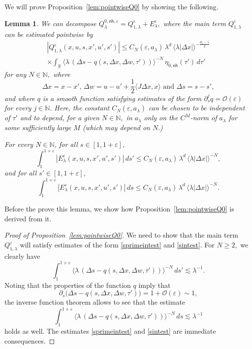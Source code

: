 \documentclass[leqno]{amsart}
\newtheorem{lemma}[theorem]{Lemma}
\theoremstyle{definition}
\theoremstyle{remark}
\numberwithin{equation}{section}
\newcommand{\R}{\mathbb{R}}
\newcommand{\N}{\mathbb{N}}
\newcommand\la{{\lambda}}
\newcommand\ve{{\varepsilon}}
\begin{document}
We will prove Proposition~\ref{lem:pointwiseQ0} by showing the following.

\begin{lemma}\label{lem:pointwiseQ0-precise} 
We can decompose $Q^{0,\mathsf{nh},\varepsilon}_\lambda=Q^{\varepsilon}_{1,\lambda}+E^\ve_\la,$ where the main term 
$Q^{\varepsilon}_{1,\lambda}$ can be estimated pointwise by 
\begin{multline}\label{eq:pointwiseQ0}
|Q^{\varepsilon}_{1,\lambda}(x,u,s,x',u',s')| \le C_N(\ve,a_\la)\, \lambda^d
\, \langle\lambda\left|\Delta x\right|\rangle^{-\frac{d_1-1}2} \\
\times \int_\R \big\langle \lambda\, (\Delta s - q(s,\Delta x,\Delta w,\tau') ) \big\rangle^{-N} \, \eta_{0,\mathsf{nh}}(\tau')\, d\tau'
\end{multline}
for any $N\in\N,$ where 
$$
\Delta x = x-x',\, \Delta w = u-u' +\frac 12\langle J\Delta x,x\rangle \text{ and }\Delta s=s-s',
$$ 
and where $q$ is a smooth function satisfying estimates of the form $\partial^j_s q=\mathcal O(\ve)$ for every $j\in\N.$
Here, the  constant $C_N(\ve,a_\la)$ can be chosen to be independent of  $\tau'$ and to depend, for a given $N\in\N,$  in $a_\la$ only on the $C^M$-norm of $a_\la$ for some sufficiently large $M$ (which may depend on $N.$) 

For every $N\in\N$, for all $s\in[1,1+\ve]$,
\[
\int_1^{1+\ve}| E^\ve_\la(x,u,s,x',u',s')|\, ds'  
\le C_N(\ve,a_\la)\, \lambda^d
\, \langle\lambda\left|\Delta x\right|\rangle^{-N} ,
\]
and for all $s'\in[1,1+\ve]$,
\[
\int_1^{1+\ve}| E^\ve_\la(x,u,s,x',u',s')|\, ds 
\le C_N(\ve,a_\la)\, \lambda^d
\, \langle\lambda\left|\Delta x\right|\rangle^{-N} .
\]
\end{lemma}

Before the prove this lemma, we show how Proposition~\ref{lem:pointwiseQ0} is derived from it.

\begin{proof}[Proof of Proposition~\ref{lem:pointwiseQ0}]
We need to show that the  main term $Q^{\varepsilon}_{1,\lambda}$ will satisfy estimates of the form \eqref{sprimeintest} and \eqref{sintest}. For $N\ge 2,$ we clearly have 
$$
\int_1^{1+\ve}  \big\langle\lambda\, (\Delta s - q(s,\Delta x,\Delta w,\tau') ) \big\rangle^{-N} \,ds'\lesssim \la^{-1}.
$$
Noting  that the properties of the function $q$ imply that
$$
\partial_{s}\big(\Delta s - q(s,\Delta x,\Delta w,\tau') \big)=1+\mathcal O(\ve)\sim 1,
$$
the  inverse function theorem allows to see that the  estimate 
$$
\int_1^{1+\ve}  \big\langle\lambda\, (\Delta s - q(s,\Delta x,\Delta w,\tau') ) \big\rangle^{-N} \,ds\lesssim \la^{-1}
$$
holds as well. The estimates \eqref{sprimeintest} and \eqref{sintest} are immediate consequences.
\end{proof}
\end{document}
